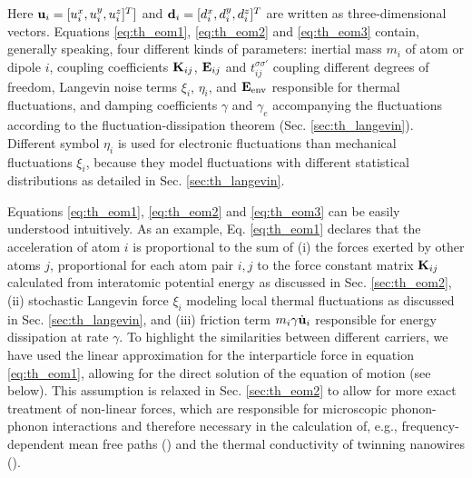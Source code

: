 Here $\mathbf{u}_i=[u_i^{x},u_i^y,u_i^z]^T]$ and $\mathbf{d}_i=[d_i^x,d_i^y,d_i^z]^T$ are written as three-dimensional vectors. Equations \eqref{eq:th_eom1}, \eqref{eq:th_eom2} and \eqref{eq:th_eom3} contain, generally speaking, four different kinds of parameters: inertial mass $m_i$ of atom or dipole $i$, coupling coefficients $\mathbf{K}_{ij}$, $\mathbf{E}_{ij}$ and $t_{ij}^{\sigma\sigma'}$ coupling different degrees of freedom, Langevin noise terms $\xi_i$, $\eta_i$, and $\mathbf{E}_{\textrm{env}}$ responsible for thermal fluctuations, and damping coefficients $\gamma$ and $\gamma_e$ accompanying the fluctuations according to the fluctuation-dissipation theorem (Sec. \ref{sec:th_langevin}). Different symbol $\eta_i$ is used for electronic fluctuations than mechanical fluctuations $\xi_i$, because they model fluctuations with different statistical distributions as detailed in Sec. \ref{sec:th_langevin}. 


Equations \eqref{eq:th_eom1}, \eqref{eq:th_eom2} and \eqref{eq:th_eom3} can be easily understood intuitively. As an example, Eq. \eqref{eq:th_eom1} declares that the acceleration of atom $i$ is proportional to the sum of (i) the forces exerted by other atoms $j$, proportional for each atom pair $i,j$ to the force constant matrix $\mathbf{K}_{ij}$ calculated from interatomic potential energy as discussed in Sec. \ref{sec:th_eom2}, (ii) stochastic Langevin force $\xi_i$ modeling local thermal fluctuations as discussed in Sec. \ref{sec:th_langevin}, and (iii) friction term $m_i \gamma \dot{\mathbf{u}}_i$ responsible for energy dissipation at rate $\gamma$. To highlight the similarities between different carriers, we have used the linear approximation for the interparticle force in equation \eqref{eq:th_eom1}, allowing for the direct solution of the equation of motion (see below). This assumption is relaxed in Sec. \ref{sec:th_eom2} to allow for more exact treatment of non-linear forces, which are responsible for microscopic phonon-phonon interactions and therefore necessary in the calculation of, e.g., frequency-dependent mean free paths () and the thermal conductivity of twinning nanowires (). %

